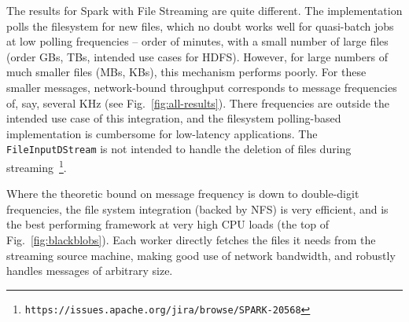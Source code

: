 \documentclass[letterpaper,conference]{IEEEtran}
\begin{document}
The results for Spark with File Streaming are quite different. The implementation polls the filesystem for new files, which no doubt works well for quasi-batch jobs at low polling frequencies -- order of minutes, with a small number of large files (order GBs, TBs, intended use cases for HDFS). However, for large numbers of much smaller files (MBs, KBs), this mechanism performs poorly. For these smaller messages, network-bound throughput corresponds to message frequencies of, say, several KHz (see Fig.~\ref{fig:all-results}). There frequencies are outside the intended use case of this integration, and the filesystem polling-based implementation is cumbersome for low-latency applications. %
The \texttt{FileInputDStream} is not intended to handle the deletion of files during streaming~\footnote{\texttt{https://issues.apache.org/jira/browse/SPARK-20568}}.

Where the theoretic bound on message frequency is down to double-digit frequencies, %
the file system integration (backed by NFS) is very efficient, and is the best performing framework at very high CPU loads (the top of Fig.~\ref{fig:blackblobs}). Each worker directly fetches the files it needs from the streaming source machine, making good use of network bandwidth, and robustly handles messages of arbitrary size. 
\end{document}
